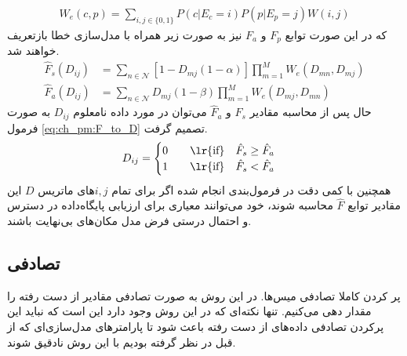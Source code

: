 \begin{equation}
	\begin{aligned}
		W_e(c,p) = \sum_{i,j \in \{0,1\}} P(c|E_c=i)P(p|E_p=j)W(i,j)
	\end{aligned}
	\label{eq:ch_pm:W_e}
\end{equation}
که در این صورت توابع $F_p$ و $F_a$ نیز به صورت زیر همراه با مدل‌سازی خطا بازتعریف خواهند شد.
\begin{equation}
	\begin{aligned}
		\hat{F}_s(D_{ij}) &= \sum_{n \in \mathcal{N}}  [1-D_{mj}(1-\alpha)]  \prod_{m=1}^{M} W_e(D_{mn}, D_{mj}) \\
		\hat{F}_a(D_{ij}) &= \sum_{n \in \mathcal{N}}  D_{mj}(1-\beta)  \prod_{m=1}^{M} W_e(D_{mj}, D_{mn})
	\end{aligned}
	\label{eq:ch_pm:F_all_final}
\end{equation}
حال پس از محاسبه مقادیر $\hat{F}_s$ و $\hat{F}_a$ می‌توان در مورد داده نامعلوم $D_{ij}$  به صورت فرمول \ref{eq:ch_pm:F_to_D} تصمیم گرفت.
\begin{equation}
	D_{ij} = \begin{cases}
		0 \qquad \text{\lr{if}} \quad \hat{F}_s \ge \hat{F}_a \\
		1 \qquad \text{\lr{if}} \quad \hat{F}_s < \hat{F}_a
	\end{cases}
	\label{eq:ch_pm:F_to_D}
\end{equation}
همچنین با کمی دقت در فرمول‌بندی انجام شده اگر برای تمام $i,j$های ماتریس $D$ این مقادیر توابع $\hat{F}$ محاسبه شوند، خود می‌توانند معیاری برای ارزیابی پایگاه‌داده در دسترس و احتمال درستی فرض مدل مکان‌های بی‌نهایت باشند.



\subsection{تصادفی}
پر کردن کاملا تصادفی میس‌ها. در این روش به صورت تصادفی مقادیر از دست رفته را مقدار دهی می‌کنیم. تنها نکته‌ای که در این روش وجود دارد این است که نباید این پرکردن تصادفی داده‌های از دست رفته باعث شود تا پارامترهای مدل‌سازی‌ای که از قبل در نظر گرفته بودیم با این روش نادقیق شوند.


